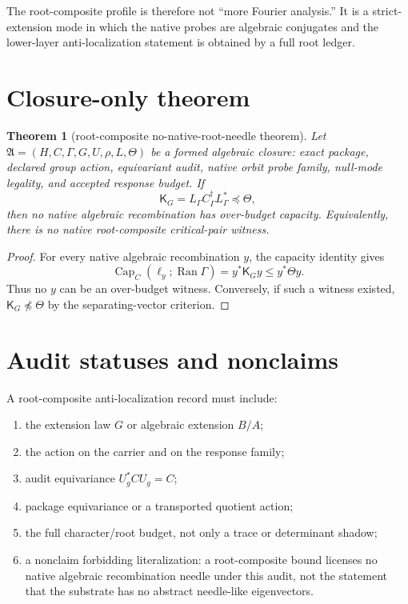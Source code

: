 \documentclass[11pt]{article}
\newtheorem{theorem}{Theorem}[section]
\providecommand{\Cap}{\operatorname{Cap}}
\newcommand{\Ran}{\operatorname{Ran}}
\newcommand{\K}{\mathsf K}
\begin{document}
The root-composite profile is therefore not ``more Fourier analysis.''  It is a strict-extension mode in which the native probes are algebraic conjugates and the lower-layer anti-localization statement is obtained by a full root ledger.

\section{Closure-only theorem}

\begin{theorem}[root-composite no-native-root-needle theorem]
Let $\mathfrak A=(H,C,\Gamma,G,U,\rho,L,\Theta)$ be a formed algebraic closure: exact package, declared group action, equivariant audit, native orbit probe family, null-mode legality, and accepted response budget.  If
\[
  \K_G=L_\Gamma C_\Gamma^\dagger L_\Gamma^*\preceq\Theta,
\]
then no native algebraic recombination has over-budget capacity.  Equivalently, there is no native root-composite critical-pair witness.
\end{theorem}

\begin{proof}
For every native algebraic recombination $y$, the capacity identity gives
\[
  \Cap_C(\ell_y;\Ran\Gamma)=y^*\K_Gy\le y^*\Theta y.
\]
Thus no $y$ can be an over-budget witness.  Conversely, if such a witness existed, $\K_G\npreceq\Theta$ by the separating-vector criterion.
\end{proof}

\section{Audit statuses and nonclaims}

A root-composite anti-localization record must include:
\begin{enumerate}[label=(\roman*)]
  \item the extension law $G$ or algebraic extension $B/A$;
  \item the action on the carrier and on the response family;
  \item audit equivariance $U_g^*CU_g=C$;
  \item package equivariance or a transported quotient action;
  \item the full character/root budget, not only a trace or determinant shadow;
  \item a nonclaim forbidding literalization: a root-composite bound licenses no native algebraic recombination needle under this audit, not the statement that the substrate has no abstract needle-like eigenvectors.
\end{enumerate}
\end{document}
